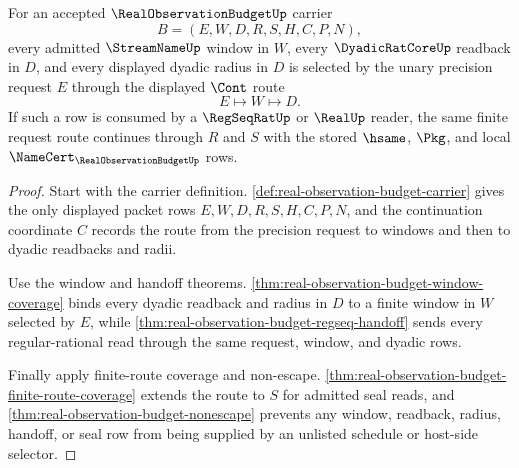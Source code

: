 \begin{theorem}
\label{thm:real-observation-budget-window-request-totalization}
For an accepted $\RealObservationBudgetUp$ carrier
$$
B=(E,W,D,R,S,H,C,P,N),
$$
every admitted $\StreamNameUp$ window in $W$, every $\DyadicRatCoreUp$ readback in $D$, and every displayed dyadic radius in $D$ is selected by the unary precision request $E$ through the displayed $\Cont$ route
$$
E \longmapsto W \longmapsto D.
$$
If such a row is consumed by a $\RegSeqRatUp$ or $\RealUp$ reader, the same finite request route continues through $R$ and $S$ with the stored $\hsame$, $\Pkg$, and local $\NameCert_{\RealObservationBudgetUp}$ rows.
\end{theorem}
\begin{proof}
Start with the carrier definition. \autoref{def:real-observation-budget-carrier} gives the only displayed packet rows $E,W,D,R,S,H,C,P,N$, and the continuation coordinate $C$ records the route from the precision request to windows and then to dyadic readbacks and radii.

Use the window and handoff theorems. \autoref{thm:real-observation-budget-window-coverage} binds every dyadic readback and radius in $D$ to a finite window in $W$ selected by $E$, while \autoref{thm:real-observation-budget-regseq-handoff} sends every regular-rational read through the same request, window, and dyadic rows.

Finally apply finite-route coverage and non-escape. \autoref{thm:real-observation-budget-finite-route-coverage} extends the route to $S$ for admitted seal reads, and \autoref{thm:real-observation-budget-nonescape} prevents any window, readback, radius, handoff, or seal row from being supplied by an unlisted schedule or host-side selector.
\end{proof}

